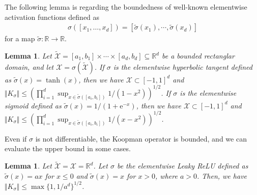 \documentclass[twoside]{article}
\newtheorem{lemma}[proposition]{Lemma}
\def\mcl#1{\mathcal{#1}}
\def\mr{\mathrm}
\begin{document}
The following lemma is regarding the boundedness of well-known elementwise activation functions defined as 
\begin{align*}
\sigma([x_1,\ldots,x_{d}])=[\tilde{\sigma}(x_1),\cdots,\tilde{\sigma}(x_{d})]
\end{align*}
for a map $\tilde{\sigma}:\mathbb{R}\to\mathbb{R}$.
\begin{lemma}\label{lem:sigmoid_tanh}
Let $\tilde{\mcl{X}}=[a_1,b_1]\times\cdots\times [a_d,b_d]\subseteq \mathbb{R}^d$ be a bounded rectanglar domain, and let $\mcl{X}=\sigma(\tilde{\mcl{X}})$.
If $\sigma$ is the elementwise hyperbolic tangent defined as $\tilde{\sigma}(x)=\tanh(x)$, then we have $\mcl{X}\subset [-1,1]^d$ and $\Vert K_{\sigma}\Vert\le (\prod_{i=1}^d\sup_{x\in \tilde{\sigma}([a_i,b_i])}1/(1-x^2))^{1/2}$.
If $\sigma$ is the elementwise sigmoid defined as $\tilde{\sigma}(x)=1/(1+\mr{e}^{-x})$, then we have $\mcl{X}\subset [-1,1]^d$ and $\Vert K_{\sigma}\Vert\le (\prod_{i=1}^d\sup_{x\in \tilde{\sigma}([a_i,b_i])}1/(x-x^2))^{1/2}$.
\end{lemma}

Even if $\sigma$ is not differentiable, the Koopman operator is bounded, and we can evaluate the upper bound in some cases.
\begin{lemma}\label{lem:Leaky_relu}
Let $\tilde{\mcl{X}}=\mcl{X}=\mathbb{R}^{d}$.
Let $\sigma$ be the elementwise Leaky ReLU defined as $\tilde{\sigma}(x)=ax$ for $x\le 0$ and $\tilde{\sigma}(x)=x$ for $x>0$, where $a>0$.
Then, we have $\Vert K_{\sigma}\Vert\le \max\{1, {1}/{a^d}\}^{1/2}$.
\end{lemma}
\end{document}
